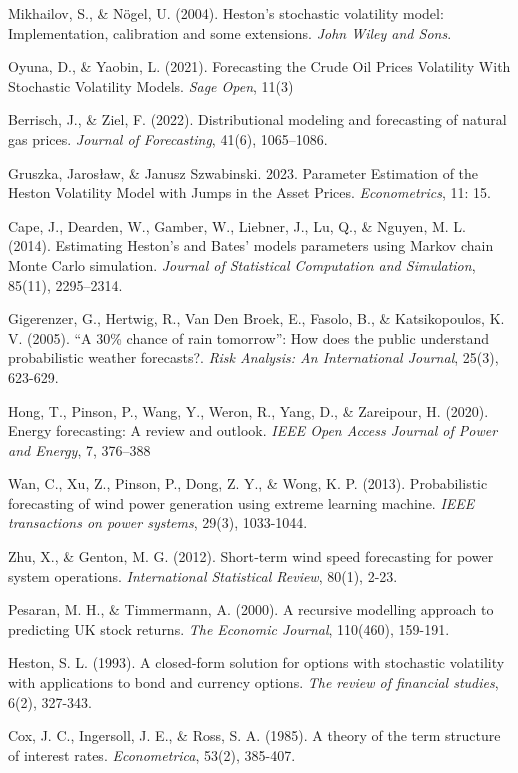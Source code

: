 \documentclass[12pt,a4paper]{article}
\numberwithin{equation}{section}
\begin{document}
\begin{thebibliography}{11}
\bibitem{}
Mikhailov, S., \& Nögel, U. (2004). Heston’s stochastic volatility model: Implementation, calibration and some extensions. \emph{John Wiley and Sons}.

\bibitem{}
Oyuna, D., \& Yaobin, L. (2021). Forecasting the Crude Oil Prices Volatility With Stochastic Volatility Models. \emph{Sage Open}, 11(3)

\bibitem{}
Berrisch, J., \& Ziel, F. (2022). Distributional modeling and forecasting of natural gas prices. \emph{Journal of Forecasting}, 41(6), 1065–1086. 


\bibitem{}
Gruszka, Jarosław, \& Janusz Szwabinski. 2023. Parameter Estimation of the Heston Volatility Model with Jumps in the Asset Prices. \emph{Econometrics}, 11: 15.

\bibitem{}
Cape, J., Dearden, W., Gamber, W., Liebner, J., Lu, Q., \& Nguyen, M. L. (2014). Estimating Heston’s and Bates’ models parameters using Markov chain Monte Carlo simulation. \emph{Journal of Statistical Computation and Simulation}, 85(11), 2295–2314. 

\bibitem{}
Gigerenzer, G., Hertwig, R., Van Den Broek, E., Fasolo, B., \& Katsikopoulos, K. V. (2005). “A 30\% chance of rain tomorrow”: How does the public understand probabilistic weather forecasts?. \emph{Risk Analysis: An International Journal}, 25(3), 623-629.

\bibitem{}
Hong, T., Pinson, P., Wang, Y., Weron, R., Yang, D., \& Zareipour, H. (2020). Energy forecasting: A review and outlook. \emph{IEEE Open Access Journal of Power and Energy}, 7, 376–388

\bibitem{}
Wan, C., Xu, Z., Pinson, P., Dong, Z. Y., \& Wong, K. P. (2013). Probabilistic forecasting of wind power generation using extreme learning machine. \emph{IEEE transactions on power systems}, 29(3), 1033-1044.

\bibitem{}
Zhu, X., \& Genton, M. G. (2012). Short‐term wind speed forecasting for power system operations. \emph{International Statistical Review}, 80(1), 2-23.


\bibitem{}
Pesaran, M. H., \& Timmermann, A. (2000). A recursive modelling approach to predicting UK stock returns. \emph{The Economic Journal}, 110(460), 159-191.

\bibitem{}
Heston, S. L. (1993). A closed-form solution for options with stochastic volatility with applications to bond and currency options. \emph{The review of financial studies}, 6(2), 327-343.

\bibitem{}
Cox, J. C., Ingersoll, J. E., \& Ross, S. A. (1985). A theory of the term structure of interest rates. \emph{Econometrica}, 53(2), 385-407.


\end{thebibliography}
\end{document}
